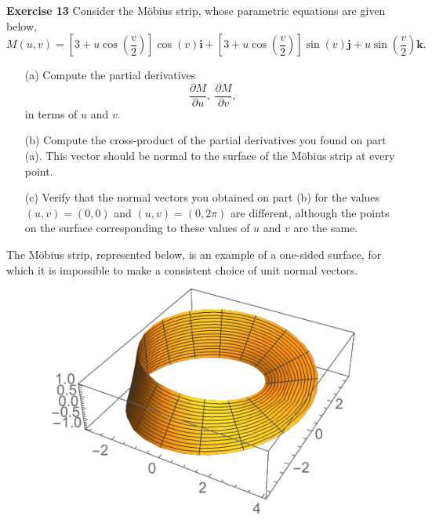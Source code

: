 \documentclass[12pt,oneside]{exam}
\newenvironment{exercise}[1]{\vspace{.1in}\noindent\textbf{Exercise #1 \hspace{.05em}}}{}
\begin{document}
\begin{exercise}{13}
Consider the M\"obius strip, whose parametric equations are given below, 
\begin{equation*}
M(u,v)=\left[3+ u\cos\left(\frac{v}{2} \right) \right]\cos(v) \textbf{i} + \left[3 + u\cos\left(\frac{v}{2}\right)\right]\sin(v) \textbf{j} + u\sin\left(\frac{v}{2}\right) \textbf{k}.
\end{equation*}

\begin{itemize} 
\item[(a)] Compute the partial derivatives 
\begin{equation*}
\frac{\partial M}{\partial u}, \ \frac{\partial M}{\partial v}, 
\end{equation*}
in terms of $u$ and $v$.
\item[(b)] Compute the cross-product of the partial derivatives you found on part (a). This vector should be normal to the surface of the M\"obius strip at every point. 
\item[(c)] Verify that the normal vectors you obtained on part (b) for the values $(u,v)=(0,0)$ and $(u,v)=(0,2\pi)$ are different, although the points on the surface corresponding to these values of $u$ and $v$ are the same. 
\end{itemize}
The M\"obius strip, represented below, is an example of a one-sided surface, for which it is impossible to make a consistent choice of unit normal vectors. 
\begin{center}
\includegraphics{mobius.pdf}
\end{center}
\end{exercise}
\end{document}
